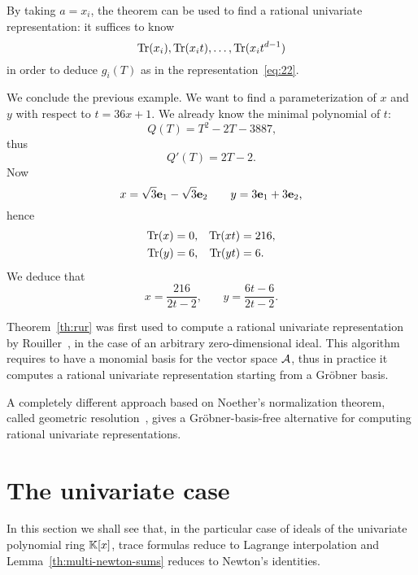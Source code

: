 By taking $a=x_i$, the theorem can be used to find a rational
univariate representation: it suffices to know
\begin{equation}
  \label{eq:44}
  \operatorname{Tr}(x_i),\operatorname{Tr}(x_it),\ldots,\operatorname{Tr}(x_it^{d-1})
\end{equation}
in order to deduce $g_i(T)$ as in the representation~\eqref{eq:22}.

\begin{example}
  We conclude the previous example. We want to find a parameterization
  of $x$ and $y$ with respect to $t=36x+1$. We already know the
  minimal polynomial of $t$:
  \[Q(T) = T^2-2T-3887\text{,}\]
  thus
  \[Q'(T) = 2T-2\text{.}\]
  Now
  \[x=\sqrt{3}\mathbf{e}_1 -\sqrt{3}\mathbf{e}_2 \qquad
  y = 3\mathbf{e}_1 + 3\mathbf{e}_2\text{,}\]
  hence 
  \begin{align*}
    \operatorname{Tr}(x) &= 0\text{,} & \operatorname{Tr}(xt) &= 216\text{,}\\
    \operatorname{Tr}(y) &= 6\text{,} & \operatorname{Tr}(yt) &= 6\text{.}
  \end{align*}
  We deduce that
  \[x=\frac{216}{2t-2}\text{,}\qquad
  y=\frac{6t-6}{2t-2}\text{.}\]
\end{example}

\begin{nota}
  Theorem~\ref{th:rur} was first used to compute a rational univariate
  representation by Rouiller~\cite{rouiller99}, in the case of an
  arbitrary zero-dimensional ideal. This algorithm requires to have a
  monomial basis for the vector space $\mathcal{A}$, thus in practice it
  computes a rational univariate representation starting from a
  Gröbner basis.

  A completely different approach based on Noether's normalization
  theorem, called geometric resolution~\cite{giusti+lecerf+salvy01},
  gives a Gröbner-basis-free alternative for computing rational
  univariate representations.
\end{nota}


\section{The univariate case}
\label{sec:univariate-case}
In this section we shall see that, in the particular case of ideals of
the univariate polynomial ring $\mathbb{K}[x]$, trace formulas reduce to
Lagrange interpolation and Lemma~\ref{th:multi-newton-sums} reduces to
Newton's identities.

